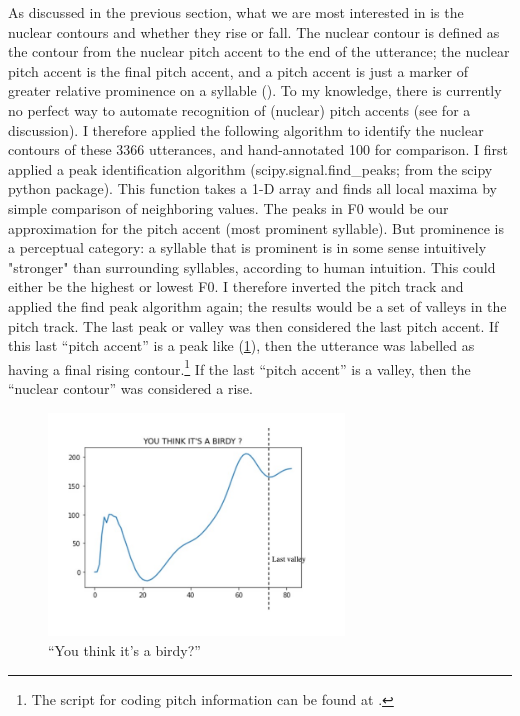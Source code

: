 As discussed in the previous section, what we are most interested in is the nuclear contours and whether they rise or fall. The nuclear contour is defined as the contour from the nuclear pitch accent to the end of the utterance; the nuclear pitch accent is the final pitch accent, and a pitch accent is just a marker of greater relative prominence on a syllable (\cite{buring2016intonation}). To my knowledge, there is currently no perfect way to automate recognition of (nuclear) pitch accents (see \cite{buring2016intonation} for a discussion). I therefore applied the following algorithm to identify the nuclear contours of these 3366 utterances, and hand-annotated 100 for comparison. I first applied a peak identification algorithm (\textsf{scipy.signal.find\_peaks}; from the scipy python package). This function takes a 1-D array and finds all local maxima by simple comparison of neighboring values. The peaks in F0 would be our approximation for the pitch accent (most prominent syllable). But prominence is a perceptual category: a syllable that is prominent is in some sense intuitively "stronger" than surrounding syllables, according to human intuition. This could either be the highest or lowest F0. I therefore inverted the pitch track and applied the find peak algorithm again; the results would be a set of valleys in the pitch track. The last peak or valley was then considered the last pitch accent. If this last ``pitch accent'' is a peak like (\ref{fig:rise-example}), then the utterance was labelled as having a final rising contour.\footnote{The script for coding pitch information can be found at \mycode{}.} If the last ``pitch accent'' is a valley, then the ``nuclear contour'' was considered a rise. 

 
\begin{figure}[H]
    \centering
    \includegraphics[width=0.7\textwidth]{figures/pitch-rise.jpg}
    \caption{``You think it's a birdy?''}
    \label{fig:rise-example}
\end{figure}


